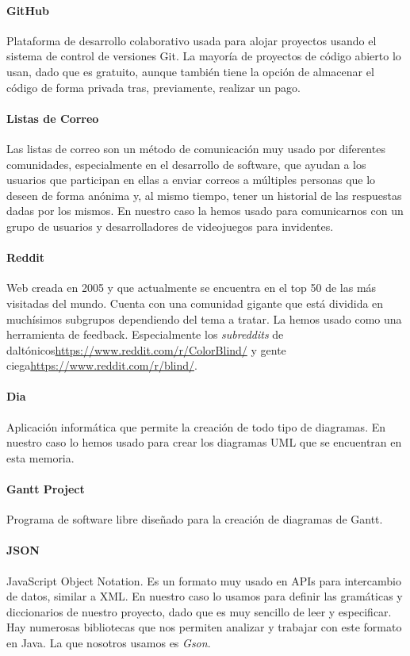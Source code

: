  \paragraph{GitHub} Plataforma de desarrollo colaborativo usada para alojar proyectos usando el sistema de control de versiones Git. La mayoría de proyectos de código abierto lo usan, dado que es gratuito, aunque también tiene la opción de almacenar el código de forma privada tras, previamente, realizar un pago.

 \paragraph{Listas de Correo} Las listas de correo son un método de comunicación muy usado por diferentes comunidades, especialmente en el desarrollo de software, que ayudan a los usuarios que participan en ellas a enviar correos a múltiples personas que lo deseen de forma anónima y, al mismo tiempo, tener un historial de las respuestas dadas por los mismos. En nuestro caso la hemos usado para comunicarnos con un grupo de usuarios y desarrolladores de videojuegos para invidentes.

 \paragraph{Reddit} Web creada en 2005 y que actualmente se encuentra en el top 50 de las más visitadas del mundo. Cuenta con una comunidad gigante que está dividida en muchísimos subgrupos dependiendo del tema a tratar. La hemos usado como una herramienta de feedback. Especialmente los \textit{subreddits} de daltónicos\url{https://www.reddit.com/r/ColorBlind/} y gente ciega\url{https://www.reddit.com/r/blind/}. 

\paragraph{Dia} Aplicación informática que permite la creación de todo tipo de diagramas. En nuestro caso lo hemos usado para crear los diagramas UML que se encuentran en esta memoria.

\paragraph{Gantt Project} Programa de software libre diseñado para la creación de diagramas de Gantt.

\paragraph{JSON} JavaScript Object Notation. Es un formato muy usado en APIs para intercambio de datos, similar a XML. En nuestro caso lo usamos para definir las gramáticas y diccionarios de nuestro proyecto, dado que es muy sencillo de leer y especificar. Hay numerosas bibliotecas que nos permiten analizar y trabajar con este formato en Java. La que nosotros usamos es \textit{Gson}.

